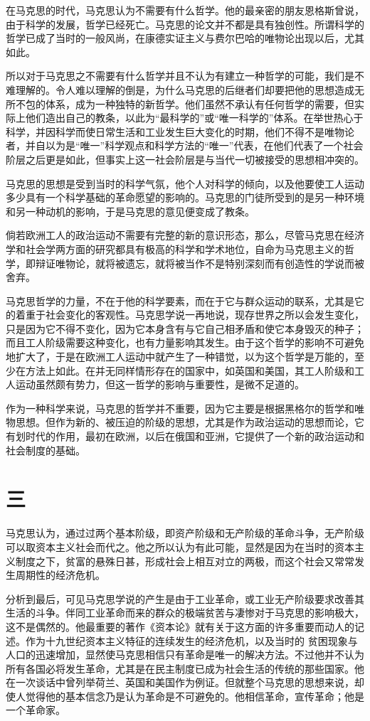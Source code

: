 \documentclass[12pt,oneside]{book}
\begin{document}
\begin{common-format}
在马克思的时代，马克思认为不需要有什么哲学。他的最亲密的朋友恩格斯曾说，由于科学的发展，哲学已经死亡。马克思的论文并不都是具有独创性。所谓科学的哲学已成了当时的一般风尚，在康德实证主义与费尔巴哈的唯物论出现以后，尤其如此。

所以对于马克思之不需要有什么哲学并且不认为有建立一种哲学的可能，我们是不难理解的。令人难以理解的倒是，为什么马克思的后继者们却要把他的思想造成无所不包的体系，成为一种独特的新哲学。他们虽然不承认有任何哲学的需要，但实际上他们造出自己的教条，以此为“最科学的”或“唯一科学的”体系。在举世热心于科学，并因科学而使日常生活和工业发生巨大变化的时期，他们不得不是唯物论者，并自以为是“唯一”科学观点和科学方法的“唯一”代表，在他们代表了一个社会阶层之后更是如此，但事实上这一社会阶层是与当代一切被接受的思想相冲突的。

马克思的思想是受到当时的科学气氛，他个人对科学的倾向，以及他要使工人运动多少具有一个科学基础的革命愿望的影响的。马克思的门徒所受到的是另一种环境和另一种动机的影响，于是马克思的意见便变成了教条。

倘若欧洲工人的政治运动不需要有完整的新的意识形态，那么，尽管马克思在经济学和社会学两方面的研究都具有极高的科学和学术地位，自命为马克思主义的哲学，即辩证唯物论，就将被遗忘，就将被当作不是特别深刻而有创造性的学说而被舍弃。

马克思哲学的力量，不在于他的科学要素，而在于它与群众运动的联系，尤其是它的着重于社会变化的客观性。马克思学说一再地说，现存世界之所以会发生变化，只是因为它不得不变化，因为它本身含有与它自己相矛盾和使它本身毁灭的种子；而且工人阶级需要这种变化，也有力量影响其发生。由于这个哲学的影响不可避免地扩大了，于是在欧洲工人运动中就产生了一种错觉，以为这个哲学是万能的，至少在方法上如此。在并无同样情形存在的国家中，如英国和美国，其工人阶级和工人运动虽然颇有势力，但这一哲学的影响与重要性，是微不足道的。

作为一种科学来说，马克思的哲学并不重要，因为它主要是根据黑格尔的哲学和唯物思想。但作为新的、被压迫的阶级的思想，尤其是作为政治运动的思想而论，它有划时代的作用，最初在欧洲，以后在俄国和亚洲，它提供了一个新的政治运动和社会制度的基础。

\section{三}
马克思认为，通过过两个基本阶级，即资产阶级和无产阶级的革命斗争，无产阶级可以取资本主义社会而代之。他之所以认为有此可能，显然是因为在当时的资本主义制度之下，贫富的悬殊日甚，形成社会上相互对立的两极，而这个社会又常常发生周期性的经济危机。

分析到最后，可见马克思学说的产生是由于工业革命，或工业无产阶级要求改善其生活的斗争。伴同工业革命而来的群众的极端贫苦与凄惨对于马克思的影响极大，这不是偶然的。他最重要的著作《资本论》就有关于这方面的许多重要而动人的记述。作为十九世纪资本主义特征的连续发生的经济危机，以及当时的    贫困现象与人口的迅速增加，显然使马克思相信只有革命是唯一的解决方法。不过他并不认为所有各国必将发生革命，尤其是在民主制度已成为社会生活的传统的那些国家。他在一次谈话中曾列举荷兰、英国和美国作为例证。但就整个马克思的思想来说，却使人觉得他的基本信念乃是认为革命是不可避免的。他相信革命，宣传革命；他是一个革命家。


\end{common-format}
\end{document}
